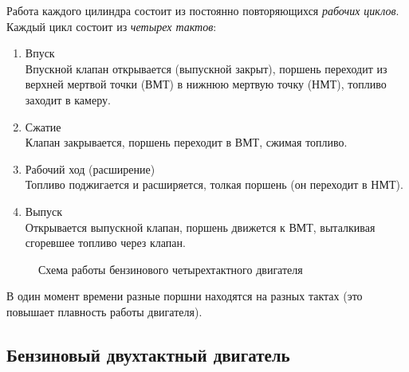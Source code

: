 \documentclass[a4paper,14pt]{article}
\begin{document}
        Работа каждого цилиндра состоит из постоянно повторяющихся \textit{рабочих циклов}. Каждый цикл состоит из \textit{четырех тактов}:
        \begin{enumerate}
            \item Впуск\\
                Впускной клапан открывается (выпускной закрыт), поршень переходит из верхней мертвой точки (ВМТ) в нижнюю мертвую точку (НМТ), топливо заходит в камеру.
            \item Сжатие\\
                Клапан закрывается, поршень переходит в ВМТ, сжимая топливо.
            \item Рабочий ход (расширение)\\
                Топливо поджигается и расширяется, толкая поршень (он переходит в НМТ).
            \item Выпуск\\
                Открывается выпускной клапан, поршень движется к ВМТ, выталкивая сгоревшее топливо через клапан.
        \end{enumerate}
        \begin{figure}[h]
            \caption{Схема работы бензинового четырехтактного двигателя}
        \end{figure}

        В один момент времени разные поршни находятся на разных тактах (это повышает плавность работы двигателя).
    \subsection{Бензиновый двухтактный двигатель}
\end{document}
